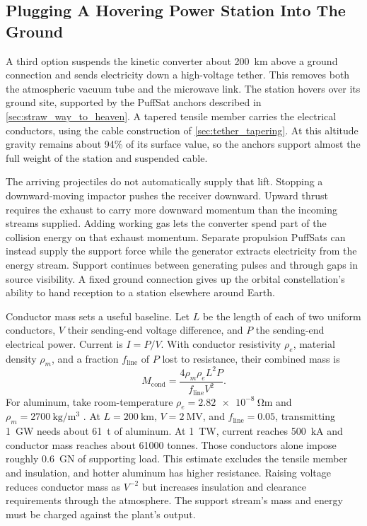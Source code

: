\documentclass{article}
\begin{document}
\subsection{Plugging A Hovering Power Station Into The Ground}\label{sec:tethered_kinetic_power}

A third option suspends the kinetic converter about \SI{200}{\kilo\meter} above a ground connection and sends electricity down a high-voltage tether. This removes both the atmospheric vacuum tube and the microwave link. The station hovers over its ground site, supported by the PuffSat anchors described in \autoref{sec:straw_way_to_heaven}. A tapered tensile member carries the electrical conductors, using the cable construction of \autoref{sec:tether_tapering}. At this altitude gravity remains about 94\% of its surface value, so the anchors support almost the full weight of the station and suspended cable.

The arriving projectiles do not automatically supply that lift. Stopping a downward-moving impactor pushes the receiver downward. Upward thrust requires the exhaust to carry more downward momentum than the incoming streams supplied. Adding working gas lets the converter spend part of the collision energy on that exhaust momentum. Separate propulsion PuffSats can instead supply the support force while the generator extracts electricity from the energy stream. Support continues between generating pulses and through gaps in source visibility. A fixed ground connection gives up the orbital constellation's ability to hand reception to a station elsewhere around Earth.

Conductor mass sets a useful baseline. Let $L$ be the length of each of two uniform conductors, $V$ their sending-end voltage difference, and $P$ the sending-end electrical power. Current is $I=P/V$. With conductor resistivity $\rho_e$, material density $\rho_m$, and a fraction $f_{\mathrm{line}}$ of $P$ lost to resistance, their combined mass is
\begin{equation}
    M_{\mathrm{cond}} = \frac{4\rho_m\rho_e L^2 P}{f_{\mathrm{line}}V^2}.
\end{equation}
For aluminum, take room-temperature $\rho_e = \SI{2.82e-8}{\ohm\meter}$ and $\rho_m = \SI{2700}{\kilogram\per\meter\cubed}$ \cite{crc_handbook}. At $L=\SI{200}{\kilo\meter}$, $V=\SI{2}{\mega\volt}$, and $f_{\mathrm{line}}=0.05$, transmitting \SI{1}{\giga\watt} needs about \SI{61}{\tonne} of aluminum. At \SI{1}{\tera\watt}, current reaches \SI{500}{\kilo\ampere} and conductor mass reaches about \num{61000} tonnes. Those conductors alone impose roughly \SI{0.6}{\giga\newton} of supporting load. This estimate excludes the tensile member and insulation, and hotter aluminum has higher resistance. Raising voltage reduces conductor mass as $V^{-2}$ but increases insulation and clearance requirements through the atmosphere. The support stream's mass and energy must be charged against the plant's output.
\end{document}
